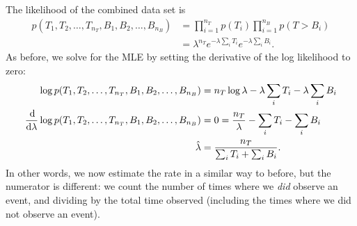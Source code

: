 \documentclass[12pt]{article}
\begin{document}
The likelihood of the combined data set is
\begin{align*}
  p(T_1, T_2, \ldots, T_{n_T}, B_1, B_2, \ldots, B_{n_B})
  &= \prod_{i=1}^{n_T} p(T_i) \prod_{i=1}^{n_B} p(T > B_i) \\
  &= \lambda^{n_T}e^{-\lambda \sum_iT_i}e^{-\lambda \sum_iB_i}.
\end{align*}
As before, we solve for the MLE by setting the derivative of the log likelihood to zero:
\begin{align*}
  \log p(T_1, T_2, \ldots, T_{n_T}, B_1, B_2, \ldots, B_{n_B})
  &= n_T\log \lambda - \lambda \sum_iT_i - \lambda \sum_iB_i \\
  \ddlambda \log p(T_1, T_2, \ldots, T_{n_T}, B_1, B_2, \ldots, B_{n_B})
  &= 0 = \frac{n_T}{\lambda} - \sum_iT_i - \sum_iB_i \\
  \hat \lambda &= \frac{n_T}{\sum_iT_i + \sum_iB_i}.
\end{align*}
In other words, we now estimate the rate in a similar way to before, but the numerator is different:
we count the number of times where we \emph{did} observe an event, and dividing by the total time
observed (including the times where we did not observe an event).
\end{document}
